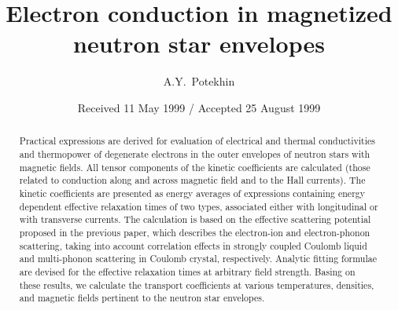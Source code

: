 \documentclass{aa}
\begin{document}
\title{Electron conduction in magnetized
       neutron star envelopes}

\author{A.Y.\ Potekhin}
\date{Received  11 May 1999 / Accepted 25 August 1999}
\maketitle
\begin{abstract}
%
Practical expressions are derived for evaluation of
electrical and thermal conductivities
and thermopower of degenerate electrons
in the outer envelopes of neutron stars with magnetic fields.
All tensor components of the kinetic coefficients are calculated
(those related to conduction 
along and across magnetic field and to the Hall currents).
The kinetic coefficients are presented as
energy averages of expressions containing
energy dependent effective relaxation times of two types,
associated either with longitudinal or with transverse
currents. The calculation
is based on the effective scattering
potential proposed in the previous paper,
which describes the electron-ion and electron-phonon scattering,
taking into account correlation effects
in strongly coupled Coulomb liquid
and multi-phonon scattering in Coulomb crystal, respectively.
Analytic fitting formulae are devised
for the effective relaxation times
at arbitrary field strength.
Basing on these results, we calculate the transport coefficients
at various temperatures, densities, and magnetic
fields pertinent to the neutron star envelopes.
%

\end{abstract}

\setcounter{page}{787}
\end{document}
